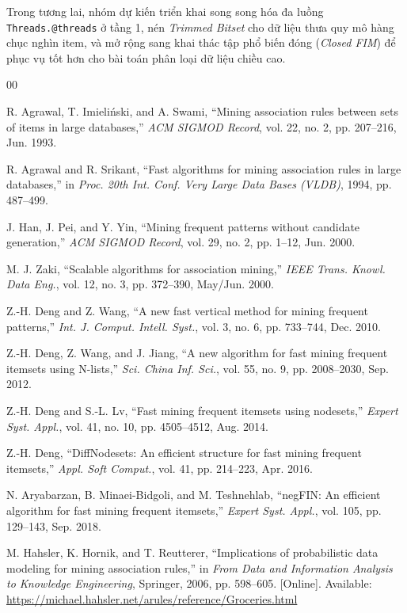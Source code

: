 \documentclass[conference]{IEEEtran}
\begin{document}
Trong tương lai, nhóm dự kiến triển khai song song hóa đa luồng \texttt{Threads.@threads} ở tầng 1, nén \textit{Trimmed Bitset} cho dữ liệu thưa quy mô hàng chục nghìn item, và mở rộng sang khai thác tập phổ biến đóng (\textit{Closed FIM}) để phục vụ tốt hơn cho bài toán phân loại dữ liệu chiều cao.

\begin{thebibliography}{00}

 R. Agrawal, T. Imieliński, and A. Swami, ``Mining association rules between sets of items in large databases,'' \textit{ACM SIGMOD Record}, vol. 22, no. 2, pp. 207--216, Jun. 1993.

 R. Agrawal and R. Srikant, ``Fast algorithms for mining association rules in large databases,'' in \textit{Proc. 20th Int. Conf. Very Large Data Bases (VLDB)}, 1994, pp. 487--499.

 J. Han, J. Pei, and Y. Yin, ``Mining frequent patterns without candidate generation,'' \textit{ACM SIGMOD Record}, vol. 29, no. 2, pp. 1--12, Jun. 2000.

 M. J. Zaki, ``Scalable algorithms for association mining,'' \textit{IEEE Trans. Knowl. Data Eng.}, vol. 12, no. 3, pp. 372--390, May/Jun. 2000.

 Z.-H. Deng and Z. Wang, ``A new fast vertical method for mining frequent patterns,'' \textit{Int. J. Comput. Intell. Syst.}, vol. 3, no. 6, pp. 733--744, Dec. 2010.

 Z.-H. Deng, Z. Wang, and J. Jiang, ``A new algorithm for fast mining frequent itemsets using N-lists,'' \textit{Sci. China Inf. Sci.}, vol. 55, no. 9, pp. 2008--2030, Sep. 2012.

 Z.-H. Deng and S.-L. Lv, ``Fast mining frequent itemsets using nodesets,'' \textit{Expert Syst. Appl.}, vol. 41, no. 10, pp. 4505--4512, Aug. 2014.

 Z.-H. Deng, ``DiffNodesets: An efficient structure for fast mining frequent itemsets,'' \textit{Appl. Soft Comput.}, vol. 41, pp. 214--223, Apr. 2016.

 N. Aryabarzan, B. Minaei-Bidgoli, and M. Teshnehlab, ``negFIN: An efficient algorithm for fast mining frequent itemsets,'' \textit{Expert Syst. Appl.}, vol. 105, pp. 129--143, Sep. 2018.

 M. Hahsler, K. Hornik, and T. Reutterer, ``Implications of probabilistic data modeling for mining association rules,'' in \textit{From Data and Information Analysis to Knowledge Engineering}, Springer, 2006, pp. 598--605. [Online]. Available: \url{https://michael.hahsler.net/arules/reference/Groceries.html}


\end{thebibliography}
\end{document}
